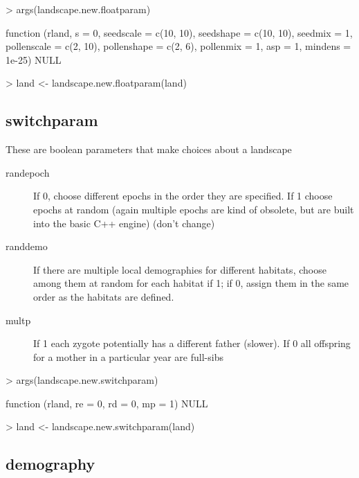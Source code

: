 \documentclass[10pt]{article}
\begin{document}
\begin{Schunk}
\begin{Sinput}
> args(landscape.new.floatparam)
\end{Sinput}
\begin{Soutput}
function (rland, s = 0, seedscale = c(10, 10), seedshape = c(10, 
    10), seedmix = 1, pollenscale = c(2, 10), pollenshape = c(2, 
    6), pollenmix = 1, asp = 1, mindens = 1e-25) 
NULL
\end{Soutput}
\begin{Sinput}
> land <- landscape.new.floatparam(land)
\end{Sinput}
\end{Schunk}

\subsection{switchparam}
\label{sec:switchparams}
These are boolean parameters that make choices about a landscape
\begin{description}

\item [randepoch] If 0, choose different epochs in the order they are specified.  If 1 choose epochs at random (again multiple epochs are kind of obsolete, but are built into the basic C++ engine) (don't change)
\item [randdemo] If there are multiple local demographies for
  different habitats, choose among them at random for each habitat if
  1; if 0, assign them in the same order as the habitats are defined.
\item [multp] If 1 each zygote potentially has a different father
  (slower).  If 0 all offspring for a mother in a particular year are
  full-sibs
\end{description}

\begin{Schunk}
\begin{Sinput}
> args(landscape.new.switchparam)
\end{Sinput}
\begin{Soutput}
function (rland, re = 0, rd = 0, mp = 1) 
NULL
\end{Soutput}
\begin{Sinput}
> land <- landscape.new.switchparam(land)
\end{Sinput}
\end{Schunk}

\subsection{demography}
\label{sec:demography}
\end{document}
